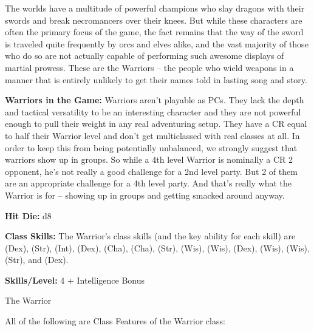 
The worlds have a multitude of powerful champions who slay dragons with their swords and break necromancers over their knees. But while these characters are often the primary focus of the game, the fact remains that the way of the sword is traveled quite frequently by orcs and elves alike, and the vast majority of those who do so are not actually capable of performing such awesome displays of martial prowess. These are the Warriors -- the people who wield weapons in a manner that is entirely unlikely to get their names told in lasting song and story.

\textbf{Warriors in the Game:} Warriors aren't playable as PCs. They lack the depth and tactical versatility to be an interesting character and they are not powerful enough to pull their weight in any real adventuring setup. They have a CR equal to half their Warrior level and don't get multiclassed with real classes at all. In order to keep this from being potentially unbalanced, we strongly suggest that warriors show up in groups. So while a 4th level Warrior is nominally a CR 2 opponent, he's not really a good challenge for a 2nd level party. But 2 of them are an appropriate challenge for a 4th level party. And that's really what the Warrior is for -- showing up in groups and getting smacked around anyway.

\textbf{Hit Die:} d8

\textbf{Class Skills:} The Warrior's class skills (and the key ability for each skill) are  (Dex),  (Str),  (Int),  (Dex),  (Cha),  (Cha),  (Str),  (Wis),  (Wis),  (Dex),  (Wis),  (Wis),  (Str), and  (Dex).

\textbf{Skills/Level:} 4 + Intelligence Bonus

\goodbab
\poorfort
\poorref
\goodwill

\begin{classtable}{The Warrior}
\end{classtable}

\ClassFeatures
All of the following are Class Features of the Warrior class:

